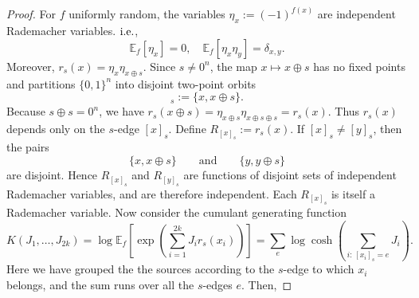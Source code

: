 \documentclass[aps,pra,superscriptaddress,twocolumn,longbibliography]{revtex4-2}
\begin{document}
\begin{proof}
For \(f\) uniformly random, the variables $\eta_x:=(-1)^{f(x)}$ are independent Rademacher variables. ${\rm i.e.}$,
%
\begin{equation}
    \mathbb{E}_{f}[\eta_x]=0, \quad  \mathbb{E}_{f}[\eta_x\eta_y]=\delta_{x,y}.
\end{equation}
%
Moreover, $r_s(x)=\eta_x\eta_{x\oplus s}$. Since \(s\neq 0^n\), the map \(x\mapsto x\oplus s\) has no fixed points and partitions \(\{0,1\}^n\) into disjoint two-point orbits
%
\begin{equation*}
        [x]_s:=\{x,x\oplus s\}.
\end{equation*}
%
Because \(s\oplus s=0^n\), we have $ r_s(x\oplus s) = \eta_{x\oplus s}\eta_{x\oplus s\oplus s} = r_s(x)$. Thus \(r_s(x)\) depends only on the \(s\)-edge \([x]_s\). Define $ R_{[x]_s}:=r_s(x)$. If \([x]_s\neq [y]_s\), then the pairs
\[
    \{x,x\oplus s\}
    \qquad\text{and}\qquad
    \{y,y\oplus s\}
\]
are disjoint. Hence \(R_{[x]_s}\) and \(R_{[y]_s}\) are functions of disjoint
sets of independent Rademacher variables, and are therefore independent.
Each \(R_{[x]_s}\) is itself a Rademacher variable. Now consider the cumulant generating function
%
\begin{equation*}
K(J_1,\dots,J_{2k})=\log\mathbb{E}_{f}\left[\exp\left(\sum_{i=1}^{2k}J_i r_s(x_i)\right) \right]=\sum_{e}
    \log\cosh
    \left(
        \sum_{i:\,[x_i]_s=e}J_i
    \right).
\end{equation*}
%
Here we have grouped the the sources according to the \(s\)-edge to which \(x_i\) belongs, and the sum runs over all the \(s\)-edges \(e\). Then,


\end{proof}
\end{document}
